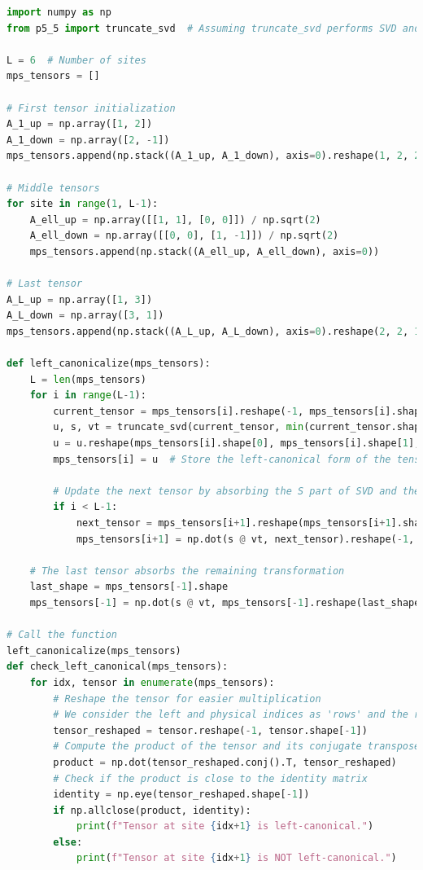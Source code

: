 \documentclass[12pt]{article}
\begin{document}
\begin{lstlisting}[language=Python]
import numpy as np
from p5_5 import truncate_svd  # Assuming truncate_svd performs SVD and truncates based on some criterion

L = 6  # Number of sites
mps_tensors = []

# First tensor initialization
A_1_up = np.array([1, 2])
A_1_down = np.array([2, -1])
mps_tensors.append(np.stack((A_1_up, A_1_down), axis=0).reshape(1, 2, 2))

# Middle tensors
for site in range(1, L-1):
    A_ell_up = np.array([[1, 1], [0, 0]]) / np.sqrt(2)
    A_ell_down = np.array([[0, 0], [1, -1]]) / np.sqrt(2)
    mps_tensors.append(np.stack((A_ell_up, A_ell_down), axis=0))

# Last tensor
A_L_up = np.array([1, 3])
A_L_down = np.array([3, 1])
mps_tensors.append(np.stack((A_L_up, A_L_down), axis=0).reshape(2, 2, 1))

def left_canonicalize(mps_tensors):
    L = len(mps_tensors)
    for i in range(L-1):
        current_tensor = mps_tensors[i].reshape(-1, mps_tensors[i].shape[-1])  # Flatten the tensor for SVD
        u, s, vt = truncate_svd(current_tensor, min(current_tensor.shape))  # Perform SVD
        u = u.reshape(mps_tensors[i].shape[0], mps_tensors[i].shape[1], u.shape[-1])  # Reshape U
        mps_tensors[i] = u  # Store the left-canonical form of the tensor

        # Update the next tensor by absorbing the S part of SVD and the entire next tensor
        if i < L-1:
            next_tensor = mps_tensors[i+1].reshape(mps_tensors[i+1].shape[0], -1)
            mps_tensors[i+1] = np.dot(s @ vt, next_tensor).reshape(-1, mps_tensors[i+1].shape[1], mps_tensors[i+1].shape[2])

    # The last tensor absorbs the remaining transformation
    last_shape = mps_tensors[-1].shape
    mps_tensors[-1] = np.dot(s @ vt, mps_tensors[-1].reshape(last_shape[0], -1)).reshape(last_shape)

# Call the function
left_canonicalize(mps_tensors)
def check_left_canonical(mps_tensors):
    for idx, tensor in enumerate(mps_tensors):
        # Reshape the tensor for easier multiplication
        # We consider the left and physical indices as 'rows' and the right index as 'columns'
        tensor_reshaped = tensor.reshape(-1, tensor.shape[-1])
        # Compute the product of the tensor and its conjugate transpose
        product = np.dot(tensor_reshaped.conj().T, tensor_reshaped)
        # Check if the product is close to the identity matrix
        identity = np.eye(tensor_reshaped.shape[-1])
        if np.allclose(product, identity):
            print(f"Tensor at site {idx+1} is left-canonical.")
        else:
            print(f"Tensor at site {idx+1} is NOT left-canonical.")


\end{lstlisting}
\end{document}
